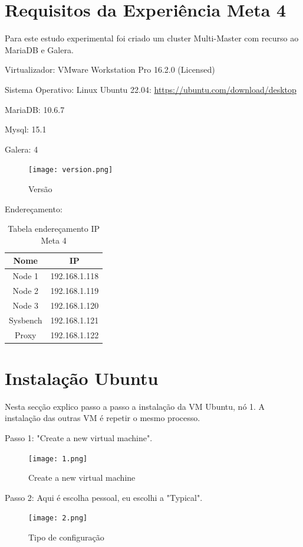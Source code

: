 \section{Requisitos da Experiência Meta 4}
Para este estudo experimental foi criado um cluster Multi-Master com recurso ao MariaDB e Galera.

Virtualizador: VMware Workstation Pro 16.2.0 (Licensed)

Sistema Operativo: Linux Ubuntu 22.04:
\url{https://ubuntu.com/download/desktop}

MariaDB: 10.6.7

Mysql: 15.1

Galera: 4

\begin{figure}[H]
\center
\texttt{[image: version.png]}
\caption{Versão}
\end{figure}

\indent Endereçamento:
\begin{table}[h]
\begin{center}
\begin{tabular}{||c c||} 
 \hline
 Nome & IP\\ [0.5ex] 
 \hline\hline
 Node 1 & 192.168.1.118\\ 
 \hline
 Node 2 & 192.168.1.119\\
 \hline
 Node 3 & 192.168.1.120\\
 \hline
 Sysbench & 192.168.1.121\\
 \hline
 Proxy & 192.168.1.122\\
 \hline
\end{tabular}
\caption{Tabela endereçamento IP Meta 4}
\end{center}
\end{table}

\newpage
\section{Instalação Ubuntu}

Nesta secção explico passo a passo a instalação da \ac{VM} Ubuntu, nó 1. A instalação das outras \ac{VM} é repetir o mesmo processo.


Passo 1: "Create a new virtual machine".
\begin{figure}[H]
\center
\texttt{[image: 1.png]}
\caption{Create a new virtual machine}
\end{figure}

Passo 2: Aqui é escolha pessoal, eu escolhi a "Typical".
\begin{figure}[H]
\center
\texttt{[image: 2.png]}
\caption{Tipo de configuração}
\end{figure}

